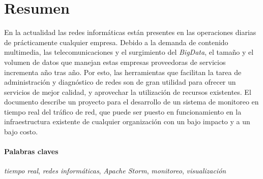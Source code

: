 \section*{Resumen}

En la actualidad las redes informáticas están presentes en las operaciones diarias de prácticamente cualquier empresa. Debido a la demanda de contenido multimedia, las telecomunicaciones y el surgimiento del \textit{BigData}, el tamaño y el volumen de datos que manejan estas empresas proveedoras de servicios incrementa año tras año. Por esto, las herramientas que facilitan la tarea de administración y diagnóstico de redes son de gran utilidad para ofrecer un servicios de mejor calidad, y aprovechar la utilización de recursos existentes.
El documento describe un proyecto para el desarrollo de un sistema de monitoreo en tiempo real del tráfico de red, que puede ser puesto en funcionamiento en la infraestructura existente de cualquier organización con un bajo impacto y a un bajo costo.

\paragraph{Palabras claves} \textit{tiempo real}, \textit{redes informáticas}, \textit{Apache Storm}, \textit{monitoreo}, \textit{visualización}

\newpage